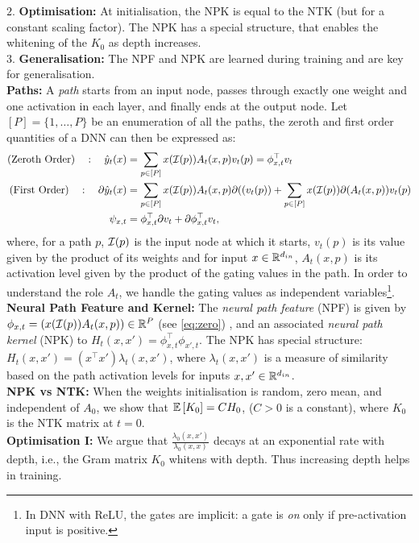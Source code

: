 $2.$ \textbf{Optimisation:}  At initialisation, the NPK is equal to the NTK (but for a constant scaling factor). The NPK has a special structure, that enables the whitening of the $K_0$ as depth increases.\hfill\\
$3.$ \textbf{Generalisation:} The NPF and NPK are learned during training and are key for generalisation.\hfill\\
\textbf{Paths:}  A \emph{path} starts from an input node, passes through exactly one weight and one activation in each layer, and finally ends at the output node. Let $[P]=\{1,\ldots,P\}$ be an enumeration of all the paths, the zeroth and first order quantities of a DNN can then be expressed as:
\begin{align}
\label{eq:zero}\text{(Zeroth Order)}\quad: \quad \hat{y}_t(x)&=\sum_{p\in [P]}x(\mathcal{I}(p))A_t(x,p)v_t(p)={\phi^\top_{x,t}} v_t\\
\text{(First Order)}\quad: \quad \partial \hat{y}_t(x)&= \sum_{p\in [P]}x(\mathcal{I}(p)) A_t(x,p) \partial((v_t(p))+\sum_{p\in [P]}x(\mathcal{I}(p)) \partial(A_t(x,p)) v_t(p)\nonumber\\
\label{eq:first}\psi_{x,t}&=\phi^\top_{x,t} {\partial} v_t + {\partial} \phi^\top_{x,t} v_t,
\end{align}
where, for a path $p$, $\mathcal{I}(p)$ is the input node at which it starts, $v_t(p)$ is its value given by the product of its weights and for input $x\in\mathbb{R}^{d_{in}}$, $A_t(x,p)$ is its activation level given by the product of the gating values in the path. In order to understand the role $A_t$, we handle the gating values as independent variables\footnote{In DNN with ReLU, the gates are implicit: a gate is \emph{on} only if pre-activation input is positive.}. \hfill\\
\textbf{Neural Path Feature and Kernel:} The \emph{neural path feature} (NPF) is given by $\phi_{x,t}=(x(\mathcal{I}(p))A_t(x,p))\in \mathbb{R}^P$ (see \eqref{eq:zero}) , and an associated \emph{neural path kernel} (NPK) to $H_t(x,x')=\phi^\top_{x,t}\phi_{x',t}$. The NPK has special structure: $H_t(x,x')=(x^\top x')\lambda_t(x,x')$, where $\lambda_t(x,x')$ is a measure of similarity based on the path activation levels for inputs $x,x'\in\mathbb{R}^{d_{in}}$. \hfill\\
\textbf{NPK vs NTK: }When the weights initialisation is random, zero mean, and independent of $A_0$, we show that $\mathbb{E}\left[K_0\right] = C H_0$, ($C>0$ is a constant), where $K_0$ is the NTK matrix at $t=0$. \hfill\\
\textbf{Optimisation I:} We argue that $\frac{\lambda_0(x,x')}{\lambda_0(x,x)}$ decays at an exponential rate with depth, i.e., the Gram matrix $K_0$ whitens with depth. Thus increasing depth helps in training. \hfill\\
